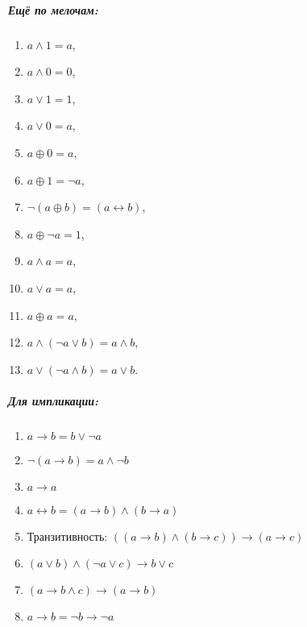 \begin{thm}
\subparagraph{Ещё по мелочам:}
\begin{enumerate}
\item $a \land 1 = a$,
\item $a \land 0 = 0$,
\item $a \lor 1 = 1$,
\item $a \lor 0 = a$,
\item $a \oplus 0 = a$,
\item $a \oplus 1 = \neg a$,
\item $\neg (a \oplus b) = (a \leftrightarrow b)$,
\item $a \oplus \neg a = 1$,
\item $a\land a = a$,
\item $a \lor a = a$,
\item $a \oplus a = a$,
\item $a \land (\neg a \lor b) = a \land b$,
\item $a \lor (\neg a \land b) = a \lor b$.
\end{enumerate}

\subparagraph{Для импликации:}
\begin{enumerate}
\item $a \rightarrow b = b \vee \neg a$
\item $\neg(a \rightarrow b) = a \wedge \neg b$
\item $a \rightarrow a$
\item $a \leftrightarrow b = (a \rightarrow b) \wedge (b\rightarrow a)$
\item Транзитивность: $((a \rightarrow b) \wedge (b \rightarrow c)) \rightarrow (a \rightarrow c)$
\item $(a \vee b) \wedge (\neg a \vee c) \rightarrow b \vee c$
\item $(a \rightarrow b \wedge c) \rightarrow (a \rightarrow b)$
\item $a \rightarrow b = \neg b \rightarrow \neg a$
\end{enumerate}
\end{thm}

